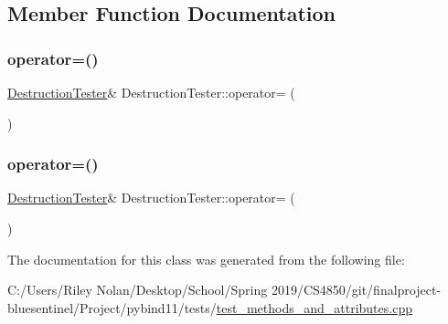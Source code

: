 \subsection{Member Function Documentation}
\mbox{\label{class_destruction_tester_a320ea89588fd7b6cd0f492854d16da89}} 
\subsubsection{\texorpdfstring{operator=()}{operator=()}\hspace{0.1cm}{\footnotesize\ttfamily [1/2]}}
{\footnotesize\ttfamily \mbox{\hyperlink{class_destruction_tester}{Destruction\+Tester}}\& Destruction\+Tester\+::operator= (\begin{DoxyParamCaption}\item[{const \mbox{\hyperlink{class_destruction_tester}{Destruction\+Tester}} \&}]{ }\end{DoxyParamCaption})\hspace{0.3cm}{\ttfamily [inline]}}

\mbox{\label{class_destruction_tester_adcdeb26cc847f0f19894d6bcae51b9a0}} 
\subsubsection{\texorpdfstring{operator=()}{operator=()}\hspace{0.1cm}{\footnotesize\ttfamily [2/2]}}
{\footnotesize\ttfamily \mbox{\hyperlink{class_destruction_tester}{Destruction\+Tester}}\& Destruction\+Tester\+::operator= (\begin{DoxyParamCaption}\item[{\mbox{\hyperlink{class_destruction_tester}{Destruction\+Tester}} \&\&}]{ }\end{DoxyParamCaption})\hspace{0.3cm}{\ttfamily [inline]}}



The documentation for this class was generated from the following file\+:\begin{DoxyCompactItemize}
\item 
C\+:/\+Users/\+Riley Nolan/\+Desktop/\+School/\+Spring 2019/\+C\+S4850/git/finalproject-\/bluesentinel/\+Project/pybind11/tests/\mbox{\hyperlink{test__methods__and__attributes_8cpp}{test\+\_\+methods\+\_\+and\+\_\+attributes.\+cpp}}\end{DoxyCompactItemize}

